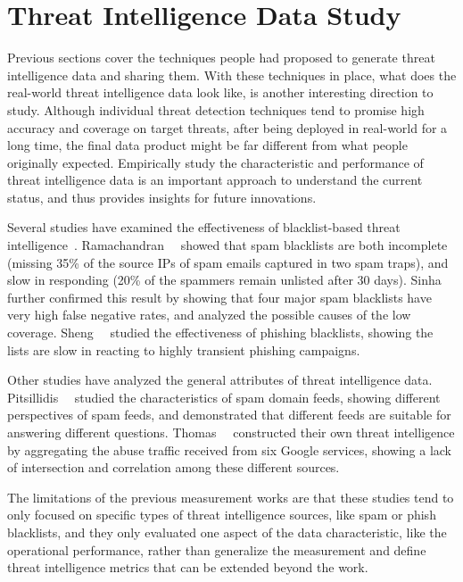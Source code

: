 \section{Threat Intelligence Data Study}

Previous sections cover the techniques people had proposed to generate
threat intelligence data and sharing them. With these 
techniques in place, what does the real-world threat intelligence 
data look like, is another interesting direction to study. Although 
individual threat detection techniques tend to promise high accuracy and
coverage on target threats, after being deployed in real-world for a long
time, the final data product might be far different from what 
people originally expected. Empirically study the characteristic and 
performance of threat intelligence data is an important approach to 
understand the current status, and thus provides insights for future 
innovations.

Several studies have examined the effectiveness of blacklist-based 
threat intelligence~\cite{kuhrer2014paint, ramachandran2006revealing, 
ramachandran2007filtering, sheng2009empirical, sinha2008shades}.
Ramachandran~\etal~\cite{ramachandran2007filtering} showed that spam 
blacklists are both incomplete (missing 35\% of the source IPs of 
spam emails captured in two spam traps), and slow in responding 
(20\% of the spammers remain unlisted after 30 days).
Sinha~\etal~\cite{sinha2008shades} further confirmed this result by 
showing that four major spam blacklists have very high false negative
rates, and analyzed the possible causes of the low coverage.
Sheng~\etal~\cite{sheng2009empirical} studied the effectiveness of
phishing blacklists, showing the lists are slow in reacting to
highly transient phishing campaigns.

Other studies have analyzed the general attributes of threat
intelligence data. Pitsillidis~\etal~\cite{tasters:imc12} studied the
characteristics of spam domain feeds, showing different perspectives
of spam feeds, and demonstrated that different feeds are suitable for
answering different questions. Thomas~\etal~\cite{thomas2016abuse}
constructed their own threat intelligence by aggregating the abuse
traffic received from six Google services, showing a lack of
intersection and correlation among these different sources. 

The limitations of the previous measurement works are that these 
studies tend to only focused on specific types of threat intelligence 
sources, like spam or phish blacklists, and they only evaluated one 
aspect of the data characteristic, like the operational performance, 
rather than generalize the measurement and define threat intelligence 
metrics that can be extended beyond the work.

